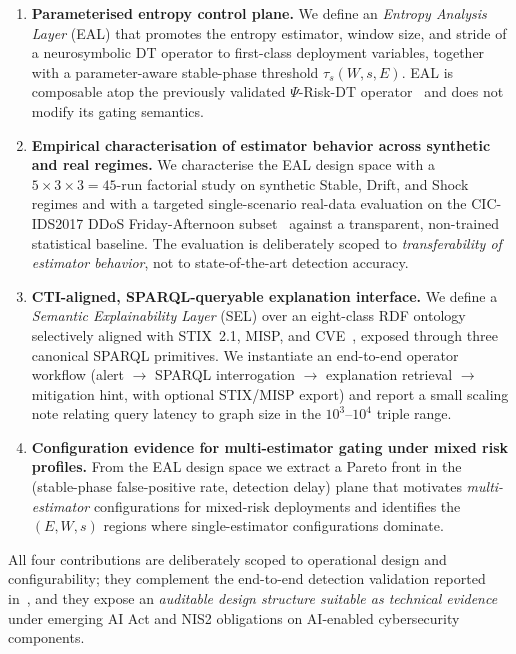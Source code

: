 \documentclass[futureinternet,article,submit,pdftex,moreauthors]{Definitions/mdpi}
\newcommand{\psiop}{\ensuremath{\Psi}}
\newcommand{\taus}{\ensuremath{\tau_{s}}}
\begin{document}
\begin{enumerate}[label=\textbf{C\arabic*.},leftmargin=*]
  \item \textbf{Parameterised entropy control plane.} We define an
        \emph{Entropy Analysis Layer} (EAL) that promotes the entropy
        estimator, window size, and stride of a neurosymbolic DT
        operator to first-class deployment variables, together with a
        parameter-aware stable-phase threshold $\taus(W, s, E)$. EAL is
        composable atop the previously validated $\psiop$-Risk-DT
        operator~\cite{paper3} and does not modify its gating semantics.
  \item \textbf{Empirical characterisation of estimator behavior across
        synthetic and real regimes.} We characterise the EAL design
        space with a $5 \times 3 \times 3 = 45$-run factorial study on
        synthetic Stable, Drift, and Shock regimes and with a targeted
        single-scenario real-data evaluation on the CIC-IDS2017 DDoS
        Friday-Afternoon subset~\cite{cicids2017} against a transparent,
        non-trained statistical baseline. The evaluation is deliberately
        scoped to \emph{transferability of estimator behavior}, not to
        state-of-the-art detection accuracy.
  \item \textbf{CTI-aligned, SPARQL-queryable explanation interface.}
        We define a \emph{Semantic Explainability Layer} (SEL) over an
        eight-class RDF ontology selectively aligned with STIX~2.1,
        MISP, and CVE~\cite{stix21,misp}, exposed through three
        canonical SPARQL primitives. We instantiate an end-to-end
        operator workflow (alert $\to$ SPARQL interrogation $\to$
        explanation retrieval $\to$ mitigation hint, with optional
        STIX/MISP export) and report a small scaling note relating query
        latency to graph size in the $10^{3}$--$10^{4}$ triple range.
  \item \textbf{Configuration evidence for multi-estimator gating under
        mixed risk profiles.} From the EAL design space we extract a
        Pareto front in the (stable-phase false-positive rate, detection
        delay) plane that motivates \emph{multi-estimator} configurations
        for mixed-risk deployments and identifies the $(E, W, s)$
        regions where single-estimator configurations dominate.
\end{enumerate}

\noindent All four contributions are deliberately scoped to operational
design and configurability; they complement the end-to-end detection
validation reported in~\cite{paper3}, and they expose an \emph{auditable
design structure suitable as technical evidence} under emerging AI Act
and NIS2 obligations on AI-enabled cybersecurity components.
\end{document}
